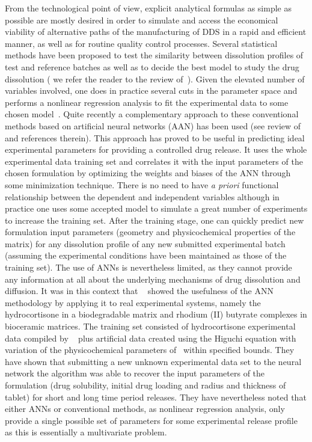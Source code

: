 \documentclass[superbib,unsortedaddress,preprint,byrevtex,aps,noshowpacs,titlepage]{revtex4}
\begin{document}
From the technological point of view, explicit analytical formulas as simple as possible are mostly
desired in order to simulate and access the economical viability of alternative paths of the 
manufacturing of DDS in a rapid and efficient manner, as well as for routine quality control processes. 
Several statistical methods have been proposed to test the similarity between dissolution profiles
of test and reference batches as well as to decide the best model to study the drug dissolution (
we refer the reader to the review of~\textcite{Costa2001}).
Given the elevated number of variables involved, one does in practice several cuts in the
parameter space and performs a nonlinear regression analysis to fit the experimental
data to some chosen model~\cite{Fu1976}.
Quite recently a complementary approach to these conventional methods based on artificial neural 
networks (AAN) has been used (see review of ~\textcite{Sun2003} and references therein). 
This approach has proved to be useful in predicting ideal experimental parameters 
for providing a controlled drug release. 
It uses the whole experimental data training set and correlates it with the input parameters of 
the chosen formulation by optimizing the weights and biases of the ANN through some minimization 
technique. 
There is no need to have {\it a priori} functional relationship between the dependent and
independent variables although in practice one uses some accepted model to simulate a great
number of experiments to increase the training set. 
After the training stage, one can quickly predict new formulation input parameters (geometry
and physicochemical properties of the matrix) for any dissolution profile of any new submitted 
experimental batch (assuming the experimental conditions have been maintained as those of the 
training set). The use of ANNs is nevertheless limited, as they cannot provide any information
at all about the underlying mechanisms of drug dissolution and diffusion.
It was in this context that ~\textcite{Reis2004} showed the usefulness of the ANN methodology
by applying it to real experimental systems, namely the hydrocortisone in a biodegradable 
matrix and rhodium (II) butyrate complexes in bioceramic matrices.
The training set consisted of hydrocortisone experimental data compiled by ~\textcite{Fu1976} plus 
artificial data created using the Higuchi equation with variation of the physicochemical parameters 
of~\textcite{Fu1976} within specified bounds.
They have shown that submitting a new unknown experimental data set to the neural network 
the algorithm was able to recover the input parameters of the formulation (drug solubility, 
initial drug loading and radius and thickness of tablet) for short and long time period releases. 
They have nevertheless noted that either ANNs or conventional methods, as nonlinear regression 
analysis, only provide a single possible set of parameters for some experimental release 
profile as this is essentially a multivariate problem.
\end{document}
